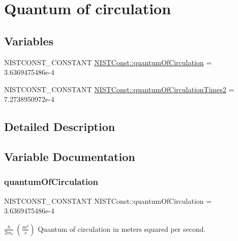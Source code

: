 \hypertarget{group___n_i_s_t_const-_quantum_of_circulation}{}\section{Quantum of circulation}
\label{group___n_i_s_t_const-_quantum_of_circulation}
\subsection*{Variables}
\begin{DoxyCompactItemize}
\item 
N\+I\+S\+T\+C\+O\+N\+S\+T\+\_\+\+C\+O\+N\+S\+T\+A\+NT \mbox{\hyperlink{group___n_i_s_t_const-_quantum_of_circulation_ga094718adb489915f76f46d2b8526ddad}{N\+I\+S\+T\+Const\+::quantum\+Of\+Circulation}} = 3.\+6369475486e-\/4
\item 
N\+I\+S\+T\+C\+O\+N\+S\+T\+\_\+\+C\+O\+N\+S\+T\+A\+NT \mbox{\hyperlink{group___n_i_s_t_const-_quantum_of_circulation_ga4d7993b701441cde35cd27b7175874c3}{N\+I\+S\+T\+Const\+::quantum\+Of\+Circulation\+Times2}} = 7.\+2738950972e-\/4
\end{DoxyCompactItemize}


\subsection{Detailed Description}


\subsection{Variable Documentation}
\mbox{\label{group___n_i_s_t_const-_quantum_of_circulation_ga094718adb489915f76f46d2b8526ddad}} 
\subsubsection{\texorpdfstring{quantum\+Of\+Circulation}{quantumOfCirculation}}
{\footnotesize\ttfamily N\+I\+S\+T\+C\+O\+N\+S\+T\+\_\+\+C\+O\+N\+S\+T\+A\+NT N\+I\+S\+T\+Const\+::quantum\+Of\+Circulation = 3.\+6369475486e-\/4}

$\frac{h}{2 m_e} \ (\frac{m^2}{s})$ Quantum of circulation in meters squared per second. \mbox{\label{group___n_i_s_t_const-_quantum_of_circulation_ga4d7993b701441cde35cd27b7175874c3}} 
